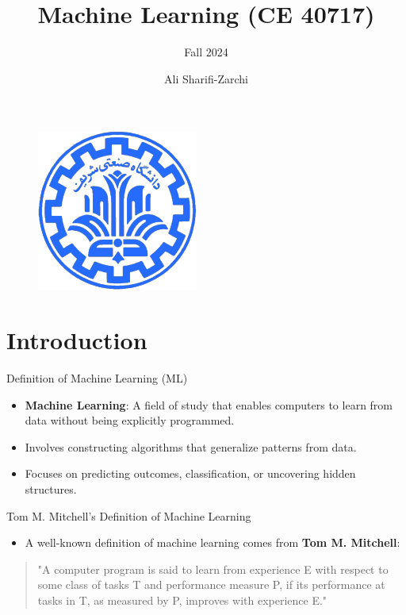 \documentclass[serif, aspectratio=169]{beamer}
\author{Ali Sharifi-Zarchi}
\title{Machine Learning (CE 40717)}
\subtitle{Fall 2024}
\institute{
    CE Department \\
    Sharif University of Technology
}
\begin{document}
\begin{frame}
    \titlepage
    \vspace*{-0.6cm}
    \begin{figure}[htpb]
        \begin{center}
            \includegraphics[keepaspectratio, scale=0.25]{pic/sharif-main-logo.png}
        \end{center}
    \end{figure}
\end{frame}

\begin{frame}    
\tableofcontents[sectionstyle=show,
subsectionstyle=show/shaded/hide,
subsubsectionstyle=show/shaded/hide]
\end{frame}

\section{Introduction}

\begin{frame}{Definition of Machine Learning (ML)}
\begin{itemize}
    \item \textbf{Machine Learning}: A field of study that enables computers to learn from data without being explicitly programmed.
    \item Involves constructing algorithms that generalize patterns from data.
    \item Focuses on predicting outcomes, classification, or uncovering hidden structures.
\end{itemize}
\end{frame}
\begin{frame}{Tom M. Mitchell's Definition of Machine Learning}
\begin{itemize}
    \item A well-known definition of machine learning comes from \textbf{Tom M. Mitchell}:
\end{itemize}
    \begin{quote}
    "A computer program is said to learn from experience E with respect to some class of tasks T and performance measure P, if its performance at tasks in T, as measured by P, improves with experience E."
    \end{quote}
\end{frame}
\end{document}
